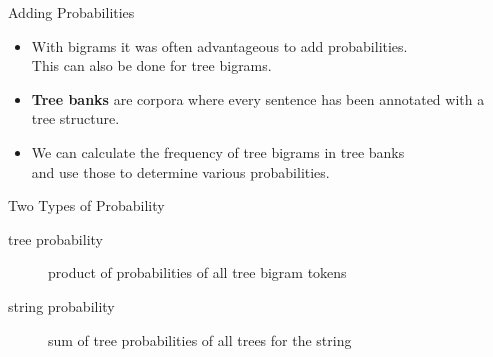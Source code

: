 \documentclass[xcolor={usenames,svgnames,x11names,dvipsnames,table}]{beamer}
\begin{document}
\begin{frame}{Adding Probabilities}
    \begin{itemize}
        \item With bigrams it was often advantageous to add probabilities.\\
              This can also be done for tree bigrams.
        \item \textbf{Tree banks} are corpora where every sentence has been annotated with a tree structure.
        \item We can calculate the frequency of tree bigrams in tree banks\\
            and use those to determine various probabilities.
    \end{itemize}
    \begin{block}{Two Types of Probability}
        \begin{description}
            \item[tree probability] product of probabilities of all tree bigram tokens
            \item[string probability] sum of tree probabilities of all trees for the string
        \end{description}
    \end{block}
\end{frame}
\end{document}
